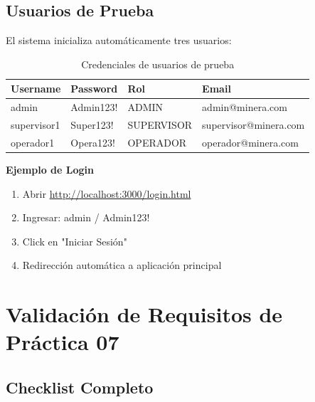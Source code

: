 \documentclass[12pt,a4paper]{article}
\begin{document}
\subsection{Usuarios de Prueba}

El sistema inicializa automáticamente tres usuarios:

\begin{table}[H]
\centering
\begin{tabular}{|l|l|l|l|}
\hline
\textbf{Username} & \textbf{Password} & \textbf{Rol} & \textbf{Email} \\
\hline
admin & Admin123! & ADMIN & admin@minera.com \\
supervisor1 & Super123! & SUPERVISOR & supervisor@minera.com \\
operador1 & Opera123! & OPERADOR & operador@minera.com \\
\hline
\end{tabular}
\caption{Credenciales de usuarios de prueba}
\end{table}

\textbf{Ejemplo de Login}
\begin{enumerate}
    \item Abrir \url{http://localhost:3000/login.html}
    \item Ingresar: admin / Admin123!
    \item Click en "Iniciar Sesión"
    \item Redirección automática a aplicación principal
\end{enumerate}

\newpage

\section{Validación de Requisitos de Práctica 07}

\subsection{Checklist Completo}
\end{document}
